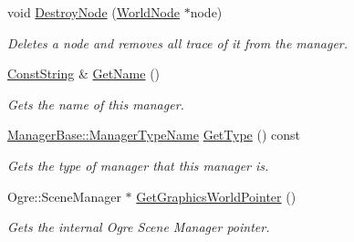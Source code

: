 \begin{DoxyCompactItemize}
void \hyperlink{classphys_1_1SceneManager_a5a2d68ab38308f9c6ac4b659cae36dee}{DestroyNode} (\hyperlink{classphys_1_1WorldNode}{WorldNode} $\ast$node)
\begin{DoxyCompactList}\small\item\em Deletes a node and removes all trace of it from the manager. \item\end{DoxyCompactList}\item 
\hyperlink{namespacephys_a5ce5049f8b4bf88d6413c47b504ebb31}{ConstString} \& \hyperlink{classphys_1_1SceneManager_ae63c31649eb018435087ce48307e2245}{GetName} ()
\begin{DoxyCompactList}\small\item\em Gets the name of this manager. \item\end{DoxyCompactList}\item 
\hyperlink{classphys_1_1ManagerBase_aaa6ccddf23892eaccb898529414f80a5}{ManagerBase::ManagerTypeName} \hyperlink{classphys_1_1SceneManager_af2b4f6bc50d40ffe06f6172c3d1dd02d}{GetType} () const 
\begin{DoxyCompactList}\small\item\em Gets the type of manager that this manager is. \item\end{DoxyCompactList}\item 
Ogre::SceneManager $\ast$ \hyperlink{classphys_1_1SceneManager_af3e5081f780b6527f075d1bb579f0601}{GetGraphicsWorldPointer} ()
\begin{DoxyCompactList}\small\item\em Gets the internal Ogre Scene Manager pointer. \item\end{DoxyCompactList}\end{DoxyCompactItemize}
